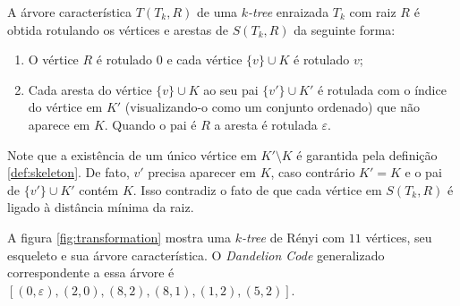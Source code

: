 \begin{definition}
  \label{def:chartree}
  \cite{caminiti} A árvore característica $T(T_k, R)$ de uma \emph{$k$-tree} enraizada $T_k$ com raiz $R$ é obtida rotulando os vértices e arestas de $S(T_k, R)$ da seguinte forma:

  \begin{enumerate}
    \item O vértice $R$ é rotulado $0$ e cada vértice $\{v\} \cup K$ é rotulado $v$;
    \item Cada aresta do vértice $\{v\} \cup K$ ao seu pai $\{v'\} \cup K'$ é rotulada com o índice do vértice em $K'$ (visualizando-o como um conjunto ordenado) que não aparece em $K$. Quando o pai é $R$ a aresta é rotulada $\varepsilon$.
  \end{enumerate}

  Note que a existência de um único vértice em $K' \setminus K$ é garantida pela definição \ref{def:skeleton}. De fato, $v'$ precisa aparecer em $K$, caso contrário $K' = K$ e o pai de $\{v'\} \cup K'$ contém $K$. Isso contradiz o fato de que cada vértice em $S(T_k, R)$ é ligado à distância mínima da raiz.
\end{definition}

A figura \ref{fig:transformation} mostra uma \emph{$k$-tree} de Rényi com $11$ vértices, seu esqueleto e sua árvore característica. O \emph{Dandelion Code} generalizado correspondente a essa árvore é $[(0, \varepsilon), (2, 0), (8, 2), (8, 1), (1, 2), (5, 2)]$.

